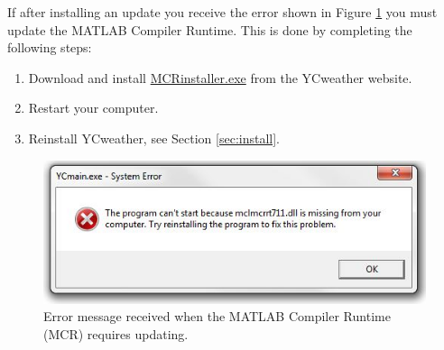 If after installing an update you receive the error shown in Figure \ref{fig:MCRerror} you must update the MATLAB Compiler Runtime. This is done by completing the following steps:
\begin{enumerate}
	\item Download and install \href{http://www.coe.montana.edu/ce/subzero/snow/}{MCRinstaller.exe} from the YCweather website. 
	\item Restart your computer.
	\item Reinstall YCweather, see Section \ref{sec:install}.
\end{enumerate}

\begin{figure}[H]\centering
\includegraphics[width=0.66\linewidth]{figures/MCRerror.jpg}
\caption{Error message received when the MATLAB Compiler Runtime (MCR) requires updating.}
\label{fig:MCRerror}
\end{figure}